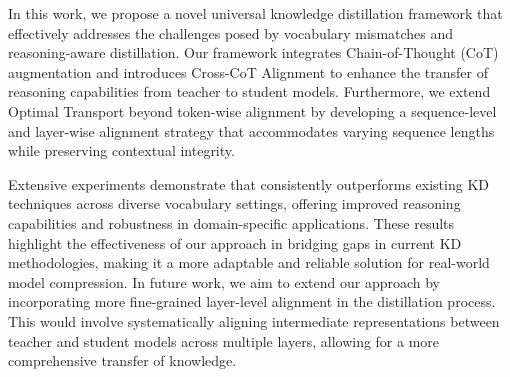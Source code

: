 In this work, we propose a novel universal knowledge distillation framework that effectively addresses the challenges posed by vocabulary mismatches and reasoning-aware distillation. Our \method framework integrates Chain-of-Thought (CoT) augmentation and introduces Cross-CoT Alignment to enhance the transfer of reasoning capabilities from teacher to student models. Furthermore, we extend Optimal Transport beyond token-wise alignment by developing a sequence-level and layer-wise alignment strategy that accommodates varying sequence lengths while preserving contextual integrity.

Extensive experiments demonstrate that \method consistently outperforms existing KD techniques across diverse vocabulary settings, offering improved reasoning capabilities and robustness in domain-specific applications. These results highlight the effectiveness of our approach in bridging gaps in current KD methodologies, making it a more adaptable and reliable solution for real-world model compression. In future work, we aim to extend our approach by incorporating more fine-grained layer-level alignment in the distillation process. This would involve systematically aligning intermediate representations between teacher and student models across multiple layers, allowing for a more comprehensive transfer of knowledge.